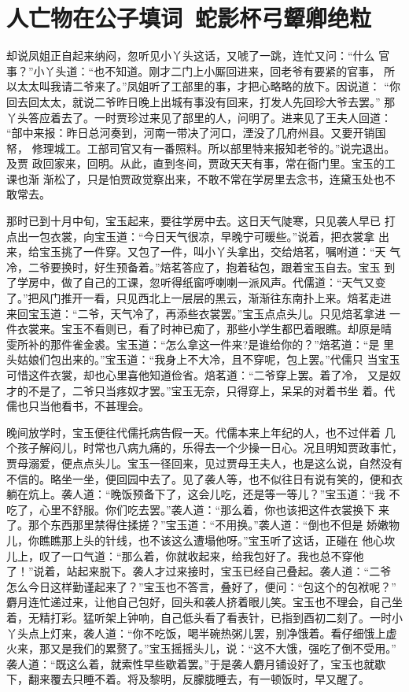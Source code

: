 \chapter{人亡物在公子填词~蛇影杯弓颦卿绝粒}

却说凤姐正自起来纳闷，忽听见小丫头这话，又唬了一跳，连忙又问：“什么
官事？”小丫头道：“也不知道。刚才二门上小厮回进来，回老爷有要紧的官事，
所以太太叫我请二爷来了。”凤姐听了工部里的事，才把心略略的放下。因说道：
“你回去回太太，就说二爷昨日晚上出城有事没有回来，打发人先回珍大爷去罢。”
那丫头答应着去了。一时贾珍过来见了部里的人，问明了。进来见了王夫人回道：
“部中来报：昨日总河奏到，河南一带决了河口，湮没了几府州县。又要开销国帑，
修理城工。工部司官又有一番照料。所以部里特来报知老爷的。”说完退出。及贾
政回家来，回明。从此，直到冬间，贾政天天有事，常在衙门里。宝玉的工课也渐
渐松了，只是怕贾政觉察出来，不敢不常在学房里去念书，连黛玉处也不敢常去。

那时已到十月中旬，宝玉起来，要往学房中去。这日天气陡寒，只见袭人早已
打点出一包衣裳，向宝玉道：“今日天气很凉，早晚宁可暖些。”说着，把衣裳拿
出来，给宝玉挑了一件穿。又包了一件，叫小丫头拿出，交给焙茗，嘱咐道：“天
气冷，二爷要换时，好生预备着。”焙茗答应了，抱着毡包，跟着宝玉自去。宝玉
到了学房中，做了自己的工课，忽听得纸窗呼喇喇一派风声。代儒道：“天气又变
了。”把风门推开一看，只见西北上一层层的黑云，渐渐往东南扑上来。焙茗走进
来回宝玉道：“二爷，天气冷了，再添些衣裳罢。”宝玉点点头儿。只见焙茗拿进
一件衣裳来。宝玉不看则已，看了时神已痴了，那些小学生都巴着眼瞧。却原是晴
雯所补的那件雀金裘。宝玉道：“怎么拿这一件来?是谁给你的？”焙茗道：“是
里头姑娘们包出来的。”宝玉道：“我身上不大冷，且不穿呢，包上罢。”代儒只
当宝玉可惜这件衣裳，却也心里喜他知道俭省。焙茗道：“二爷穿上罢。着了冷，
又是奴才的不是了，二爷只当疼奴才罢。”宝玉无奈，只得穿上，呆呆的对着书坐
着。代儒也只当他看书，不甚理会。

晚间放学时，宝玉便往代儒托病告假一天。代儒本来上年纪的人，也不过伴着
几个孩子解闷儿，时常也八病九痛的，乐得去一个少操一日心。况且明知贾政事忙，
贾母溺爱，便点点头儿。宝玉一径回来，见过贾母王夫人，也是这么说，自然没有
不信的。略坐一坐，便回园中去了。见了袭人等，也不似往日有说有笑的，便和衣
躺在炕上。袭人道：“晚饭预备下了，这会儿吃，还是等一等儿？”宝玉道：“我
不吃了，心里不舒服。你们吃去罢。”袭人道：“那么着，你也该把这件衣裳换下
来了。那个东西那里禁得住揉搓？”宝玉道：“不用换。”袭人道：“倒也不但是
娇嫩物儿，你瞧瞧那上头的针线，也不该这么遭塌他呀。”宝玉听了这话，正碰在
他心坎儿上，叹了一口气道：“那么着，你就收起来，给我包好了。我也总不穿他
了！”说着，站起来脱下。袭人才过来接时，宝玉已经自己叠起。袭人道：“二爷
怎么今日这样勤谨起来了？”宝玉也不答言，叠好了，便问：“包这个的包袱呢？”
麝月连忙递过来，让他自己包好，回头和袭人挤着眼儿笑。宝玉也不理会，自己坐
着，无精打彩。猛听架上钟响，自己低头看了看表针，已指到酉初二刻了。一时小
丫头点上灯来，袭人道：“你不吃饭，喝半碗热粥儿罢，别净饿着。看仔细饿上虚
火来，那又是我们的累赘了。”宝玉摇摇头儿，说：“这不大饿，强吃了倒不受用。”
袭人道：“既这么着，就索性早些歇着罢。”于是袭人麝月铺设好了，宝玉也就歇
下，翻来覆去只睡不着。将及黎明，反朦胧睡去，有一顿饭时，早又醒了。

